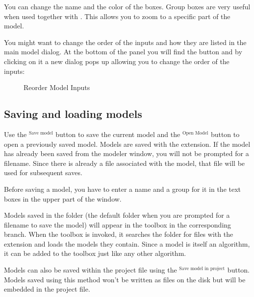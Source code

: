 \documentclass[letterpaper,10pt,english]{sphinxmanual}
\begin{document}
\sphinxAtStartPar
You can change the name and the color of the boxes.
Group boxes are very useful when used together with
.
This allows you to zoom to a specific part of the model.

\sphinxAtStartPar
You might want to change the order of the inputs and how they are listed in the
main model dialog. At the bottom of the  panel you will find the
 button and by clicking on it a new dialog pops up
allowing you to change the order of the inputs:

\begin{figure}[H]
\centering
\capstart

\noindent{}
\caption{Reorder Model Inputs}\label{\detokenize{Introduction/models:id9}}\end{figure}


\subsection{Saving and loading models}
\label{\detokenize{Introduction/models:saving-and-loading-models}}
\sphinxAtStartPar
Use the $^{\text{Save model}}$ button to save the current model and the
$^{\text{Open Model}}$ button to open a previously saved model.
Models are saved with the  extension.
If the model has already been saved from the modeler window,
you will not be prompted for a filename.
Since there is already a file associated with the model, that file
will be used for subsequent saves.

\sphinxAtStartPar
Before saving a model, you have to enter a name and a group for it
in the text boxes in the upper part of the window.

\sphinxAtStartPar
Models saved in the  folder (the default folder when you
are prompted for a filename to save the model) will appear in the
toolbox in the corresponding branch.
When the toolbox is invoked, it searches the  folder for
files with the  extension and loads the models they
contain.
Since a model is itself an algorithm, it can be added to the toolbox
just like any other algorithm.

\sphinxAtStartPar
Models can also be saved within the project file using the
$^{\text{Save model in project}}$ button.
Models saved using this method won’t be written as  files
on the disk but will be embedded in the project file.
\end{document}
